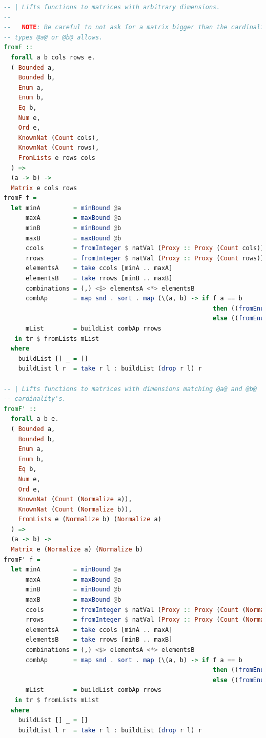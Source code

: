\documentclass[
  oneside,
  11pt, a4paper,
  footinclude=true,
  headinclude=true,
  cleardoublepage=empty
]{scrbook}
\theoremstyle{definition}
\theoremstyle{definition}
\begin{document}
\begin{lstlisting}[language=Haskell, caption={Matrix.Internal},captionpos=b]
-- | Lifts functions to matrices with arbitrary dimensions.
--
--   NOTE: Be careful to not ask for a matrix bigger than the cardinality of
-- types @a@ or @b@ allows.
fromF ::
  forall a b cols rows e.
  ( Bounded a,
    Bounded b,
    Enum a,
    Enum b,
    Eq b,
    Num e,
    Ord e,
    KnownNat (Count cols),
    KnownNat (Count rows),
    FromLists e rows cols
  ) =>
  (a -> b) ->
  Matrix e cols rows
fromF f =
  let minA         = minBound @a
      maxA         = maxBound @a
      minB         = minBound @b
      maxB         = maxBound @b
      ccols        = fromInteger $ natVal (Proxy :: Proxy (Count cols))
      rrows        = fromInteger $ natVal (Proxy :: Proxy (Count rows))
      elementsA    = take ccols [minA .. maxA]
      elementsB    = take rrows [minB .. maxB]
      combinations = (,) <$> elementsA <*> elementsB
      combAp       = map snd . sort . map (\(a, b) -> if f a == b 
                                                         then ((fromEnum a, fromEnum b), 1) 
                                                         else ((fromEnum a, fromEnum b), 0)) $ combinations
      mList        = buildList combAp rrows
   in tr $ fromLists mList
  where
    buildList [] _ = []
    buildList l r  = take r l : buildList (drop r l) r

-- | Lifts functions to matrices with dimensions matching @a@ and @b@
-- cardinality's.
fromF' ::
  forall a b e.
  ( Bounded a,
    Bounded b,
    Enum a,
    Enum b,
    Eq b,
    Num e,
    Ord e,
    KnownNat (Count (Normalize a)),
    KnownNat (Count (Normalize b)),
    FromLists e (Normalize b) (Normalize a)
  ) =>
  (a -> b) ->
  Matrix e (Normalize a) (Normalize b)
fromF' f =
  let minA         = minBound @a
      maxA         = maxBound @a
      minB         = minBound @b
      maxB         = maxBound @b
      ccols        = fromInteger $ natVal (Proxy :: Proxy (Count (Normalize a)))
      rrows        = fromInteger $ natVal (Proxy :: Proxy (Count (Normalize b)))
      elementsA    = take ccols [minA .. maxA]
      elementsB    = take rrows [minB .. maxB]
      combinations = (,) <$> elementsA <*> elementsB
      combAp       = map snd . sort . map (\(a, b) -> if f a == b 
                                                         then ((fromEnum a, fromEnum b), 1) 
                                                         else ((fromEnum a, fromEnum b), 0)) $ combinations
      mList        = buildList combAp rrows
   in tr $ fromLists mList
  where
    buildList [] _ = []
    buildList l r  = take r l : buildList (drop r l) r


\end{lstlisting}
\end{document}
